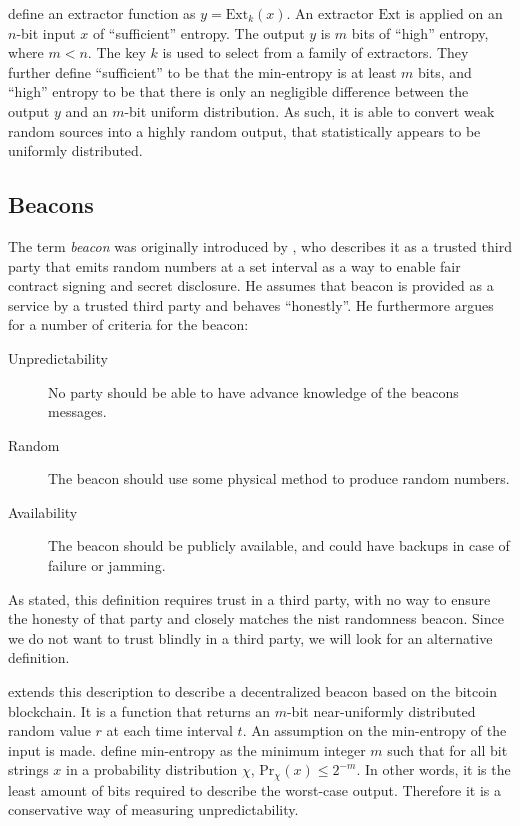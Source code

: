 \citet{bonneau2015bitcoin} define an extractor function as $y = \text{Ext}_k(x)$.
An extractor $\text{Ext}$ is applied on an $n$-bit input $x$ of \enquote{sufficient} entropy.
The output $y$ is $m$ bits of \enquote{high} entropy, where $m < n$. The key $k$ is used to select from a family of extractors.
They further define \enquote{sufficient} to be that the min-entropy is at least $m$ bits, and \enquote{high} entropy to be that there is only an negligible difference between the output $y$ and an $m$-bit uniform distribution.
As such, it is able to convert weak random sources into a highly random output, that statistically appears to be uniformly distributed.

\subsection{Beacons}

The term \emph{beacon} was originally introduced by \citet{rabin1983transaction}, who describes it as a trusted third party that emits random numbers at a set interval as a way to enable fair contract signing and secret disclosure.
He assumes that beacon is provided as a service by a trusted third party and behaves \enquote{honestly}.
He furthermore argues for a number of criteria for the beacon:

\begin{description}
    \item[Unpredictability] No party should be able to have advance knowledge of the beacons messages.
    \item[Random] The beacon should use some physical method to produce random numbers.
    \item[Availability] The beacon should be publicly available, and could have backups in case of failure or jamming.
\end{description}

As stated, this definition requires trust in a third party, with no way to ensure the honesty of that party and closely matches the \gls{nist} randomness beacon.
Since we do not want to trust blindly in a third party, we will look for an alternative definition.

\citet{bonneau2015bitcoin} extends this description to describe a decentralized beacon based on the bitcoin blockchain.
It is a function that returns an $m$-bit near-uniformly distributed random value $r$ at each time interval $t$.
An assumption on the min-entropy of the input is made. \citet{dodis2004randomness} define min-entropy as the minimum integer $m$ such that for all bit strings $x$ in a probability distribution $\chi$, $\text{Pr}_\chi(x) \leq 2^{-m}$.
In other words, it is the least amount of bits required to describe the worst-case output.
Therefore it is a conservative way of measuring unpredictability.

